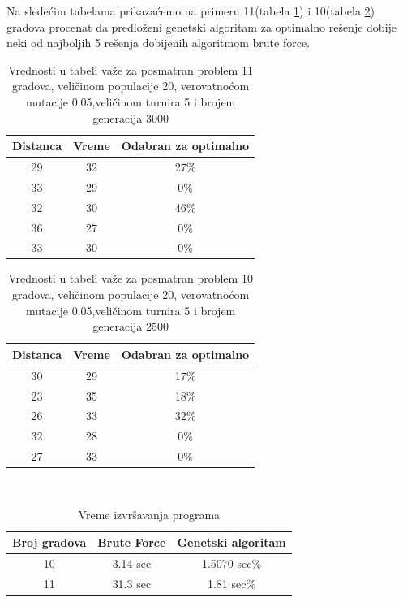 \documentclass[a4paper]{article}
\begin{document}
Na sledećim tabelama prikazaćemo na primeru 11(tabela \ref{tab:tabela1}) i 10(tabela \ref{tab:tabela2}) gradova procenat da predloženi genetski algoritam za optimalno rešenje dobije neki od najboljih 5 rešenja dobijenih algoritmom brute force.

\begin{table}[h!]
\begin{center}
\caption{Vrednosti u tabeli važe za posmatran problem 11 gradova, veličinom populacije 20, verovatnoćom mutacije 0.05,veličinom turnira 5 i brojem generacija 3000}
\begin{tabular}{|c|c|c|} \hline
Distanca& Vreme & Odabran za optimalno\\ \hline
 29& 32& 27\%\\ \hline
 33& 29& 0\%\\ \hline
 32& 30& 46\%\\ \hline
 36& 27& 0\%\\ \hline
 33& 30& 0\%\\ \hline
\end{tabular}
\label{tab:tabela1}
\end{center}
\end{table}

\begin{table}[h!]
\begin{center}
\caption{Vrednosti u tabeli važe za posmatran problem 10 gradova, veličinom populacije 20, verovatnoćom mutacije 0.05,veličinom turnira 5 i brojem generacija 2500}
\begin{tabular}{|c|c|c|} \hline
Distanca& Vreme & Odabran za optimalno\\ \hline
 30& 29& 17\%\\ \hline
 23& 35& 18\%\\ \hline
 26& 33& 32\%\\ \hline
 32& 28& 0\%\\ \hline
 27& 33& 0\%\\ \hline
\end{tabular}
\label{tab:tabela2}
\end{center}
\end{table}
\newpage
\\
\begin{table}[h!]
\begin{center}
\caption{Vreme izvršavanja programa }
\begin{tabular}{|c|c|c|} \hline
Broj gradova& Brute Force& Genetski algoritam \\ \hline
 10& 3.14 sec& 1.5070 sec\%\\ \hline
 11& 31.3 sec& 1.81 sec\%\\ \hline
\end{tabular}
\label{tab:tabela3}
\end{center}
\end{table}
\end{document}
